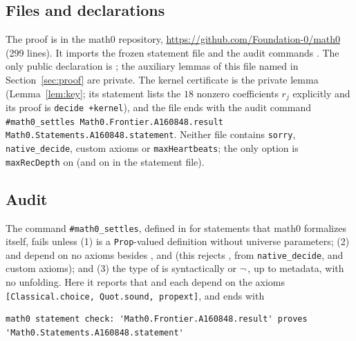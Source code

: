 \documentclass[11pt]{amsart}
\theoremstyle{plain}
\theoremstyle{definition}
\begin{document}
\subsection*{Files and declarations}
The proof is  in the math0 repository, \url{https://github.com/Foundation-0/math0} (299 lines). It imports the frozen statement file  and the audit commands . The only public declaration is ; the auxiliary lemmas of this file named in Section~\ref{sec:proof} are private. The kernel certificate is the private lemma  (Lemma~\ref{lem:key}; its statement lists the $18$ nonzero coefficients $r_j$ explicitly and its proof is \texttt{decide +kernel}), and the file ends with the audit command
\texttt{\#math0\_settles Math0.Frontier.A160848.result Math0.Statements.A160848.statement}.
Neither file contains \texttt{sorry}, \texttt{native\_decide}, custom axioms or \texttt{maxHeartbeats}; the only option is \texttt{maxRecDepth} on  (and on  in the statement file).

\subsection*{Audit}
The command \texttt{\#math0\_settles}, defined in  for statements that math0 formalizes itself, fails unless (1)  is a \texttt{Prop}-valued definition without universe parameters; (2)  and  depend on no axioms besides ,  and  (this rejects ,  from \texttt{native\_decide}, and custom axioms); and (3) the type of  is syntactically  or $\neg$\,, up to metadata, with no unfolding. Here it reports that  and  each depend on the axioms \texttt{[Classical.choice, Quot.sound, propext]}, and ends with
\begin{lstlisting}[basicstyle=\ttfamily\scriptsize]
math0 statement check: 'Math0.Frontier.A160848.result' proves 'Math0.Statements.A160848.statement'
\end{lstlisting}
\end{document}
